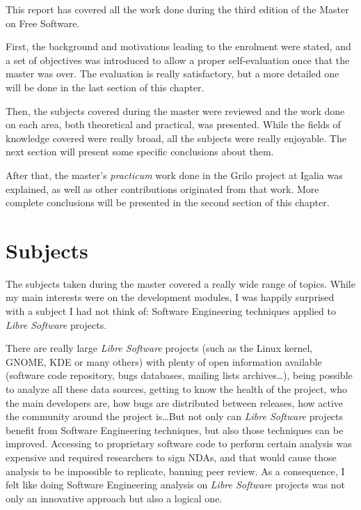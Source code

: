 This report has covered all the work done during the third edition of the
Master on Free Software.

First, the background and motivations leading to the enrolment were stated,
and a set of objectives was introduced to allow a proper self-evaluation once
that the master was over. The evaluation is really satisfactory, but a more
detailed one will be done in the last section of this chapter.

Then, the subjects covered during the master were reviewed and the work done
on each area, both theoretical and practical, was presented. While the fields
of knowledge covered were really broad, all the subjects were really enjoyable.
The next section will present some specific conclusions about them.

After that, the master's {\it practicum} work done in the Grilo project at Igalia
was explained, as well as other contributions originated from that work. More complete
conclusions will be presented in the second section of this chapter.

\section{Subjects}

The subjects taken during the master covered a really wide range of topics.
While my main interests were on the development modules, I was happily surprised
with a subject I had not think of: Software Engineering techniques applied
to {\it Libre Software} projects. 

There are really large {\it Libre Software} projects (such as the Linux kernel,
GNOME, KDE or many others) with plenty of open information available (software code repository,
bugs databases, mailing lists archives\dots), being possible to
analyze all these data sources, getting to know the health of the project,
who the main developers are, how bugs are distributed between releases, how
active the community around the project is\dots But not only can
{\it Libre Software} projects benefit from Software Engineering techniques,
but also those techniques can be improved. Accessing to proprietary software
code to perform certain analysis was expensive and required researchers to
sign NDAs, and that would cause those analysis to be impossible to replicate,
banning peer review. As a consequence, I felt like doing Software Engineering analysis
on {\it Libre Software} projects was not only an innovative approach but also
a logical one.

